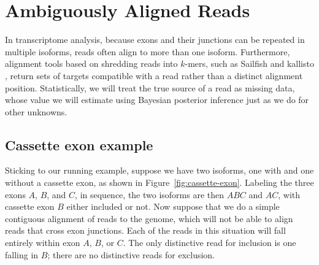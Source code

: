 \documentclass[11pt]{report}
\begin{document}
\chapter{Ambiguously Aligned Reads}

In transcriptome analysis, because exons and their junctions can be
repeated in multiple isoforms, reads often align to more than one
isoform.  Furthermore, alignment tools based on shredding reads into
$k$-mers, such as Sailfish \citep{patro2014sailfish} and kallisto
\citep{bray2016near}, return sets of targets compatible with a read
rather than a distinct alignment position.  Statistically, we will
treat the true source of a read as missing data, whose value we will
estimate using Bayesian posterior inference just as we do for other
unknowns. 

\section{Cassette exon example}

Sticking to our running example, suppose we have two isoforms, one
with and one without a cassette exon, as shown in
Figure~\ref{fig:cassette-exon}.  Labeling the three exons $A$, $B$,
and $C$, in sequence, the two isoforms are then $ABC$ and $AC$, with
cassette exon $B$ either included or not.  Now suppose that we do a
simple contiguous alignment of reads to the genome, which will not be
able to align reads that cross exon junctions.  Each of the reads in
this situation will fall entirely within exon $A$, $B$, or $C$.  The
only distinctive read for inclusion is one falling in $B$; there are
no distinctive reads for exclusion.
\end{document}
